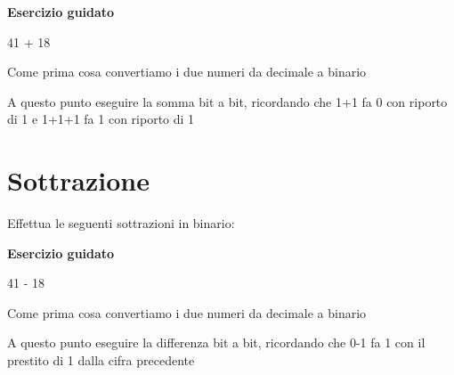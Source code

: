 \documentclass[11pt,fleqn]{book}
\begin{document}
\begin{esercizio}[1]
    \textbf{Esercizio guidato}

    41 + 18

    Come prima cosa convertiamo i due numeri da decimale a binario

    \immediate{}
    

    \immediate{}
    

    A questo punto eseguire la somma bit a bit, ricordando che 1+1 fa 0 con riporto di 1 e 1+1+1 fa 1 con riporto di 1

    \immediate{}
    

\end{esercizio}

\newpage


\section{Sottrazione}

Effettua le seguenti sottrazioni in binario:

\begin{esercizio}[1]
    \textbf{Esercizio guidato}

    41 - 18

    Come prima cosa convertiamo i due numeri da decimale a binario

    \immediate{}
    

    \immediate{}
    

    A questo punto eseguire la differenza bit a bit, ricordando che 0-1 fa 1 con il prestito di 1 dalla cifra precedente

    \immediate{}
    

\end{esercizio}

\newpage

\end{document}
